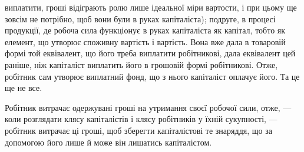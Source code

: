 \parcont{}  %
виплатити, гроші відіграють ролю лише ідеальної міри вартости, і при
цьому ще зовсім не потрібно, щоб вони були в руках капіталіста); подруге,
в процесі продукції, де робоча сила функціонує в руках капіталіста
як капітал, тобто як елемент, що утворює споживну вартість і вартість.
Вона вже дала в товаровій формі той еквівалент, що його треба виплатити
робітникові, дала еквівалент цей раніше, ніж капіталіст виплатить
його в грошовій формі робітникові. Отже, робітник сам утворює виплатний
фонд, що з нього капіталіст оплачує його. Та це ще не все.

Робітник витрачає одержувані гроші на утримання своєї робочої
сили, отже, — коли розглядати клясу капіталістів і клясу робітників у
їхній сукупності, — робітник витрачає ці гроші, щоб зберегти капіталістові
те знаряддя, що за допомогою його лише й може він лишатись
капіталістом.

